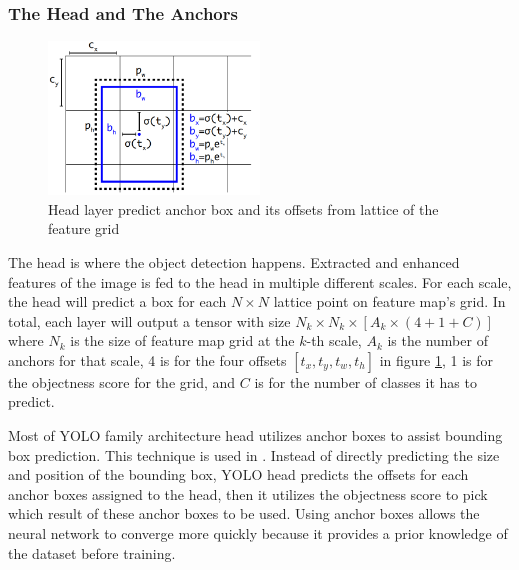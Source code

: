  

  
    \subsubsection{The Head and The Anchors}
    \begin{figure}[H]
        \centering
        \includegraphics[width=0.5\textwidth]{figures/anchorbox.png}
        \caption{Head layer predict anchor box and its offsets from lattice of the feature grid \parencite{yolov3}}
        \label{fig:anchorbox}
    \end{figure}
    The head is where the object detection happens. Extracted and enhanced features of the image is fed to the head 
    in multiple different scales. For each scale, the head will predict a box for each $N \times N$
    lattice point on feature map's grid. In total, each layer will output a tensor with size
    $N_k \times N_k \times [A_k \times (4+1+C)]$ where $N_k$ is the size of feature map grid at the $k$-th scale,
    $A_k$ is the number of anchors for that scale, 4 is for the four offsets $[t_x, t_y, t_w, t_h]$ in figure 
    \ref{fig:anchorbox}, 1 is for the objectness score for the grid, and $C$ is for the number of classes it has
    to predict.
    
    Most of YOLO family architecture head utilizes anchor boxes to assist bounding box prediction.
    This technique is used in \textcites{yolov2}{yolov3}{yolov4}{scaledyolov4}{yolov5}{yolor}{yolov7}.
    Instead of directly predicting the size and position of the bounding box, YOLO head predicts 
    the offsets for each anchor boxes assigned to the head, then it utilizes the objectness score to pick
    which result  of these anchor boxes to be used.
    Using anchor boxes allows the neural network to converge more quickly because it provides
    a prior knowledge of the dataset before training.
    
